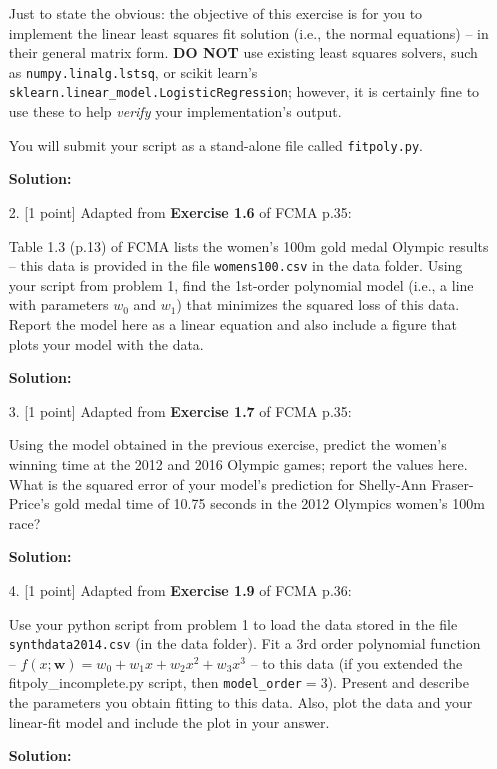 \documentclass[10pt]{article}
\begin{document}
\begin{itemize}
Just to state the obvious: the objective of this exercise is for you to implement the linear least squares fit solution (i.e., the normal equations) -- in their general matrix form.  {\bf DO NOT} use existing least squares solvers, such as {\tt numpy.linalg.lstsq}, or scikit learn's {\tt sklearn.linear\_model.LogisticRegression}; however, it is certainly fine to use these to help {\em verify} your implementation's output.

You will submit your script as a stand-alone file called {\tt fitpoly.py}.

{\bf Solution:} 


\newpage
\item[2.] [1 point]
Adapted from {\bf Exercise 1.6} of FCMA p.35:

Table 1.3 (p.13) of FCMA lists the women's 100m gold medal Olympic results -- this data is provided in the file {\tt womens100.csv} in the data folder.  Using your script from problem 1, find the 1st-order polynomial model (i.e., a line with parameters $w_0$ and $w_1$) that minimizes the squared loss of this data.  Report the model here as a linear equation and also include a figure that plots your model with the data.

{\bf Solution:} 


\item[3.] [1 point]
Adapted from {\bf Exercise 1.7} of FCMA p.35:

Using the model obtained in the previous exercise, predict the women's winning time at the 2012 and 2016 Olympic games; report the values here.  What is the squared error of your model's prediction for Shelly-Ann Fraser-Price's gold medal time of 10.75 seconds in the 2012 Olympics women's 100m race?

{\bf Solution:} 


\item[4.] [1 point]
Adapted from {\bf Exercise 1.9} of FCMA p.36:

Use your python script from problem 1 to load the data stored in the file {\tt synthdata2014.csv} (in the data folder).  Fit a 3rd order polynomial function -- $f(x; \mathbf{w}) = w_0 + w_1 x + w_2 x^2 + w_3 x^3$ -- to this data (if you extended the {fitpoly\_incomplete.py} script, then {\tt model\_order}$ = 3$).  
Present and describe the parameters you obtain fitting to this data.  Also, plot the data and your linear-fit model and include the plot in your answer.

{\bf Solution:} 



\end{itemize}
\end{document}
